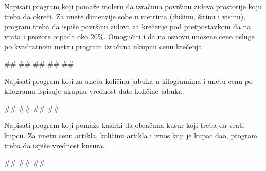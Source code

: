 \begin{Exercise}[label=p1.1_04] 
Napisati program koji pomaže moleru da izračuna površinu zidova
prostorije koju treba da okreči. Za unete dimenzije sobe u metrima (dužinu,
širinu i visinu), program treba da  ispiše površinu zidova za krečenje pod pretpostavkom da na vrata i prozore otpada oko 20\%. Omogućiti i da na osnovu 
unosene cene usluge po kvadratnom metru program izračuna ukupnu cenu krečenja.\\
\begin{miditest}
\begin{upotreba}{1}
#\naslovInt#
##
##
##
##
\end{upotreba}
\end{miditest}
\end{Exercise}
\begin{Answer}[ref=p1.1_04]
\end{Answer}



\begin{Exercise}[label=p1.1_05] 
Napisati program koji za unetu količinu jabuka u kilogramima i unetu
cenu po kilogramu ispisuje ukupnu vrednost date količine jabuka.\\
\begin{miditest}
\begin{upotreba}{1}
#\naslovInt#
##
##
##
\end{upotreba}
\end{miditest}
\end{Exercise}
\begin{Answer}[ref=p1.1_05]
\end{Answer}


\begin{Exercise}[label=p1.1_06] 
Napisati program koji pomaže kasirki da obračuna kusur koji treba da vrati kupcu. Za unetu cenu artikla, količinu artikla i iznos koji je kupac dao, program treba da ispiše vrednost kusura. \\
\begin{miditest}
\begin{upotreba}{1}
#\naslovInt#
##
##
\end{upotreba}
\end{miditest}
\end{Exercise}
\begin{Answer}[ref=p1.1_06]
\end{Answer}


